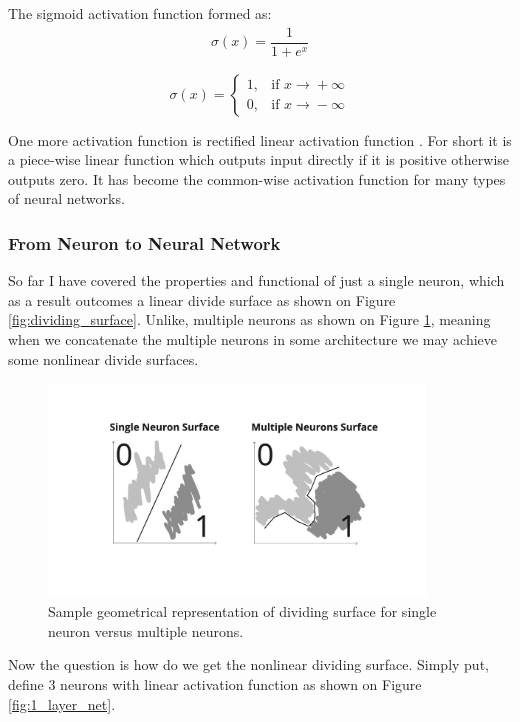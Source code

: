 The sigmoid activation function formed as:
\begin{align*}
\sigma(x) = \dfrac{1}{1+e^x}
\end{align*}

\[ \sigma(x) = \begin{cases} 1, & \mbox{if } x\mbox{$\xrightarrow{} + \infty$} \\ 0, & \mbox{if } x\mbox{$\xrightarrow{} - \infty$} \end{cases} \]

One more activation function is rectified linear activation function \cite{Eckle2019}. For short it is a piece-wise linear function which outputs input directly if it is positive otherwise outputs zero. It has become the common-wise activation function for many types of neural networks.

\subsubsection{From Neuron to Neural Network}
So far I have covered the properties and functional of just a single neuron, which as a result outcomes a linear divide surface as shown on Figure \ref{fig:dividing_surface}. Unlike, multiple neurons as shown on Figure \ref{fig:dividing_surface_2}, meaning when we concatenate the multiple neurons in some architecture we may achieve some nonlinear divide surfaces.

\begin{figure}[h]
    \begin{center}
        \includegraphics[width=10cm]{images/neuron_to_neural_net.jpeg}
        \caption {Sample geometrical representation of dividing surface for single neuron versus multiple neurons.}
        \label{fig:dividing_surface_2}
    \end{center}
\end{figure}

Now the question is how do we get the nonlinear dividing surface. Simply put, define 3 neurons with linear activation function as shown on Figure \ref{fig:1_layer_net}. 

